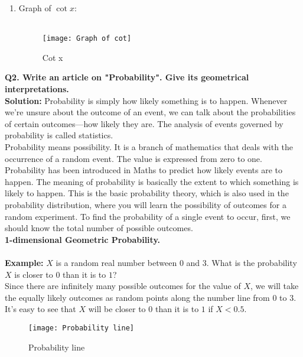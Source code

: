 \documentclass{article}
\begin{document}
\begin{enumerate}
\newpage

\item Graph of $\cot x $:\\\\
\begin{figure}[h!]
	\begin{center}
		\texttt{[image: Graph of cot]}
	\end{center}
	\caption{Cot x}
	\label{cot x}
\end{figure}
\end{enumerate}

\noindent \textbf{Q2. Write an article on "Probability". Give its geometrical interpretations.}\\
\noindent \textbf{Solution:} Probability is simply how likely something is to happen. Whenever we’re unsure about the outcome of an event, we can talk about the probabilities of certain outcomes—how likely they are. The analysis of events governed by probability is called statistics.\\ Probability means possibility. It is a branch of mathematics that deals with the occurrence of a random event. The value is expressed from zero to one. Probability has been introduced in Maths to predict how likely events are to happen. The meaning of probability is basically the extent to which something is likely to happen. This is the basic probability theory, which is also used in the probability distribution, where you will learn the possibility of outcomes for a random experiment. To find the probability of a single event to occur, first, we should know the total number of possible outcomes.\\

\noindent \textbf{\large{1-dimensional Geometric Probability.}} \\\\
\noindent \textbf{Example:} $X$ is a random real number between $0$ and $3$. What is the probability $X$ is closer to $0$ than it is to $1$? \\ Since there are infinitely many possible outcomes for the value of $X$, we will take the equally likely outcomes as random points along the number line from $0$ to $3$. It’s easy to see that $X$ will be closer to $0$ than it is to $1$ if $X<0.5$.\\

\begin{figure}[h!]
	\begin{center}
		\texttt{[image: Probability line]}
	\end{center}
	\caption{Probability line}
	\label{Probability line}
\end{figure}
\end{document}
